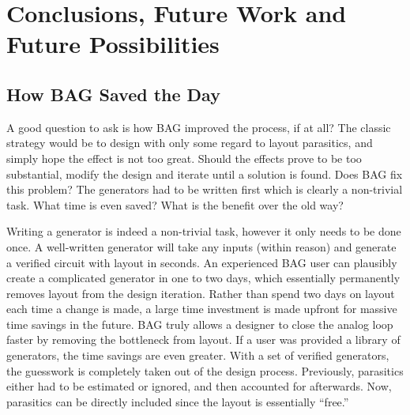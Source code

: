 \chapter{Conclusions, Future Work and Future Possibilities}

\section{How BAG Saved the Day}
A good question to ask is how BAG improved the process, if at all? The classic strategy would be to design with only some regard to layout parasitics, and simply hope the effect is not too great. Should the effects prove to be too substantial, modify the design and iterate until a solution is found. Does BAG fix this problem? The generators had to be written first which is clearly a non-trivial task. What time is even saved? What is the benefit over the old way? 

Writing a generator is indeed a non-trivial task, however it only needs to be done once. A well-written generator will take any inputs (within reason) and generate a verified circuit with layout in seconds. An experienced BAG user can plausibly create a complicated generator in one to two days, which essentially permanently removes layout from the design iteration. Rather than spend two days on layout each time a change is made, a large time investment is made upfront for massive time savings in the future. BAG truly allows a designer to close the analog loop faster by removing the bottleneck from layout. If a user was provided a library of generators, the time savings are even greater. With a set of verified generators, the guesswork is completely taken out of the design process. Previously, parasitics either had to be estimated or ignored, and then accounted for afterwards. Now, parasitics can be directly included since the layout is essentially ``free.'' 

